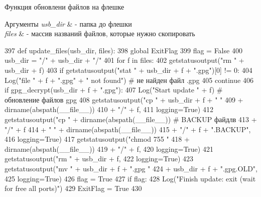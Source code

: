 Функция обновлени файлов на флешке 


\begin{DoxyParams}{Аргументы}
{\em usb\+\_\+dir} & -\/ папка до флешки \\
\hline
{\em files} & -\/ массив названий файлов, которые нужно скопировать \\
\hline
\end{DoxyParams}

\begin{DoxyCode}
397 \textcolor{keyword}{def }update\_files(usb\_dir, files):
398     \textcolor{keyword}{global} ExitFlag
399     flag = \textcolor{keyword}{False}
400     usb\_dir = \textcolor{stringliteral}{"/"} + usb\_dir + \textcolor{stringliteral}{"/"}
401     \textcolor{keywordflow}{for} f \textcolor{keywordflow}{in} files:
402         getstatusoutput(\textcolor{stringliteral}{"rm "} + usb\_dir + f)
403         \textcolor{keywordflow}{if} getstatusoutput(\textcolor{stringliteral}{"stat "} + usb\_dir + f + \textcolor{stringliteral}{".gpg"})[0] != 0:
404             Log(\textcolor{stringliteral}{"file "} + f + \textcolor{stringliteral}{".gpg"} + \textcolor{stringliteral}{" not found"}) \textcolor{comment}{# не найден файл .gpg}
405             \textcolor{keywordflow}{continue}
406         \textcolor{keywordflow}{if} gpg\_decrypt(usb\_dir + f + \textcolor{stringliteral}{".gpg"}):
407             Log(\textcolor{stringliteral}{"Start update "} + f) \textcolor{comment}{# обновление файлов gpg}
408             getstatusoutput(\textcolor{stringliteral}{"cp "} + usb\_dir + f + \textcolor{stringliteral}{" "}
409                             + dirname(abspath(\_\_file\_\_))
410                             + \textcolor{stringliteral}{"/"} + f,
411                             logging=\textcolor{keyword}{True})
412             getstatusoutput(\textcolor{stringliteral}{"cp "} + dirname(abspath(\_\_file\_\_)) \textcolor{comment}{# BACKUP файдлв}
413                             + \textcolor{stringliteral}{"/"} + f
414                             + \textcolor{stringliteral}{" "} + dirname(abspath(\_\_file\_\_))
415                             + \textcolor{stringliteral}{"/"} + f + \textcolor{stringliteral}{".BACKUP"},
416                             logging=\textcolor{keyword}{True})
417             getstatusoutput(\textcolor{stringliteral}{"chmod 755 "}
418                             + dirname(abspath(\_\_file\_\_))
419                             + \textcolor{stringliteral}{"/"} + f,
420                             logging=\textcolor{keyword}{True})
421             getstatusoutput(\textcolor{stringliteral}{"rm "} + usb\_dir + f,
422                             logging=\textcolor{keyword}{True})
423             getstatusoutput(\textcolor{stringliteral}{"mv "} + usb\_dir + f + \textcolor{stringliteral}{".gpg "}
424                             + usb\_dir + f + \textcolor{stringliteral}{".gpg.OLD"},
425                             logging=\textcolor{keyword}{True})
426             flag = \textcolor{keyword}{True}
427     \textcolor{keywordflow}{if} flag:
428         Log(\textcolor{stringliteral}{"Finish update: exit (wait for free all ports)"})
429         ExitFlag = \textcolor{keyword}{True}
430 
\end{DoxyCode}
